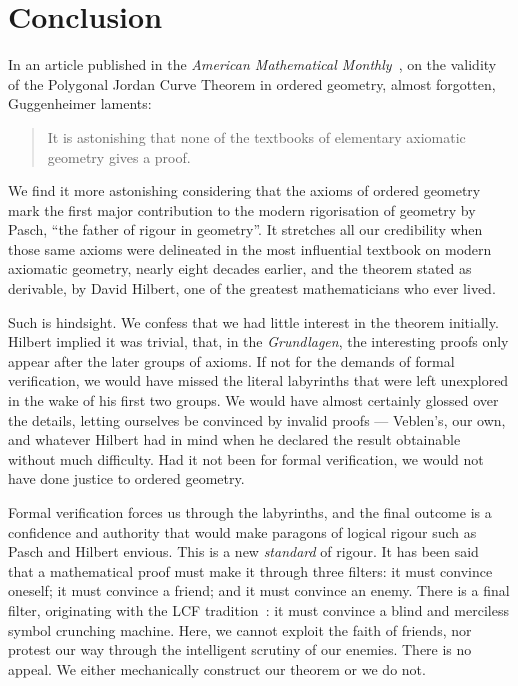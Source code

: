 \chapter{Conclusion}\label{chapter:Conclusion}
In an article published in the \emph{American Mathematical Monthly}~\cite{GuggenheimerJordanProof}, on the validity of the Polygonal Jordan Curve Theorem in ordered geometry, almost forgotten, Guggenheimer laments:
\begin{quotation}It is astonishing that none of the textbooks of elementary axiomatic geometry gives a proof.
\end{quotation}

We find it more astonishing considering that the axioms of ordered geometry mark the first major contribution to the modern rigorisation of geometry by Pasch, ``the father of rigour in geometry''. It stretches all our credibility when those same axioms were delineated in the most influential textbook on modern axiomatic geometry, nearly eight decades earlier,  and the theorem stated as derivable, by David Hilbert, one of the greatest mathematicians who ever lived.

Such is hindsight. We confess that we had little interest in the theorem initially. Hilbert implied it was trivial, that, in the \emph{Grundlagen}, the interesting proofs only appear after the later groups of axioms. If not for the demands of formal verification, we would have missed the literal labyrinths that were left unexplored in the wake of his first two groups. We would have almost certainly glossed over the details, letting ourselves be convinced by invalid proofs --- Veblen's, our own, and whatever Hilbert had in mind when he declared the result obtainable without much difficulty. Had it not been for formal verification, we would not have done justice to ordered geometry.

Formal verification forces us through the labyrinths, and the final outcome is a confidence and authority that would make paragons of logical rigour such as Pasch and Hilbert envious. This is a new \emph{standard} of rigour. It has been said~\cite{ConvinceEnemy} that a mathematical proof must make it through three filters: it must convince oneself; it must convince a friend; and it must convince an enemy. There is a final filter, originating with the LCF tradition~\cite{LCF}: it must convince a blind and merciless symbol crunching machine. Here, we cannot exploit the faith of friends, nor protest our way through the intelligent scrutiny of our enemies. There is no appeal. We either mechanically construct our theorem or we do not.

